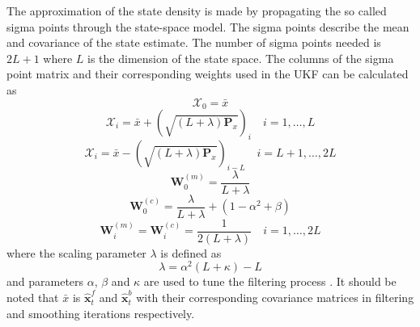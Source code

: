 \documentclass[12pt]{iopart}		%
\begin{document}
The approximation of the state density is made by propagating the so called sigma points through the state-space model. The sigma points describe the mean and covariance of the state estimate. The number of sigma points needed is $2L+1$ where $ L$ is the dimension of the state space. The  columns of the sigma point matrix and their corresponding weights used in the UKF can be calculated as
\begin{equation}
 \mathcal X_{0}=\bar x
\end{equation}
\begin{equation}
 \mathcal X_{i}=\bar x+(\sqrt{( L + \lambda)\mathbf P_x})_i \quad i=1, \dots,  L
\end{equation}
\begin{equation}
 \mathcal X_{i}=\bar x-(\sqrt{( L + \lambda)\mathbf P_x})_{i- L} \quad i= L+1, \dots, 2 L
\end{equation}
\begin{equation}
 \mathbf W_0^{(m)}=\frac{\lambda}{ L+\lambda}
\end{equation}
\begin{equation}
 \mathbf W_0^{(c)}=\frac{\lambda}{ L+\lambda}+(1-\alpha^2+\beta)
\end{equation}
\begin{equation}
 \mathbf W_i^{(m)}=\mathbf W_i^{(c)}=\frac{1}{2( L+\lambda)} \quad i=1, \dots, 2L
\end{equation}
where the scaling parameter $\lambda$ is defined as
\begin{equation}
\lambda=\alpha^2( L+\kappa)- L 
\end{equation}
and parameters $\alpha$, $\beta$ and $\kappa$ are used to tune the filtering process \cite{Haykin2001}. It should be noted that $\bar x$ is $ \hat{\mathbf x}_t^{f} $ and $ \hat{\mathbf x}_t^{b} $ with their corresponding covariance matrices in filtering and smoothing iterations respectively.

\end{document}
